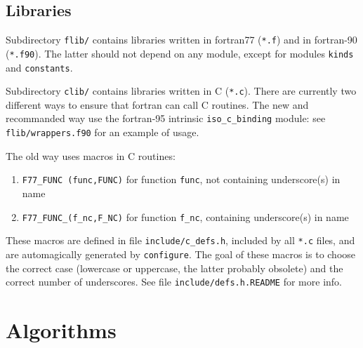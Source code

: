 \documentclass[12pt,a4paper]{article}
\def\configure{\texttt{configure}}
\begin{document}
\subsection{Libraries}

Subdirectory \texttt{flib/} contains libraries written in fortran77 
(\texttt{*.f}) and in fortran-90 (\texttt{*.f90}).
The latter should not depend on any module, except for modules
\texttt{kinds} and \texttt{constants}.

Subdirectory \texttt{clib/} contains libraries written in C 
(\texttt{*.c}). There are currently two different ways to 
ensure that fortran can call C routines. The new and recommanded 
way use the fortran-95 intrinsic \texttt{iso\_c\_binding} module: 
see \texttt{flib/wrappers.f90} for an example of usage.

The old way uses macros in C routines:
\begin{enumerate}
\item \texttt{F77\_FUNC (func,FUNC)} for function \texttt{func}, not
  containing underscore(s) in name  
\item \texttt{F77\_FUNC\_(f\_nc,F\_NC)} for function \texttt{f\_nc},
  containing underscore(s) in name 
\end{enumerate}
These macros are defined in file \texttt{include/c\_defs.h},
included by all \texttt{*.c} files, and are automagically 
generated by \configure. The goal of these macros is to
choose the correct case (lowercase or uppercase, the latter
probably obsolete) and the correct number of underscores. 
See file \texttt{include/defs.h.README} for more info.


\section{Algorithms}
\end{document}
